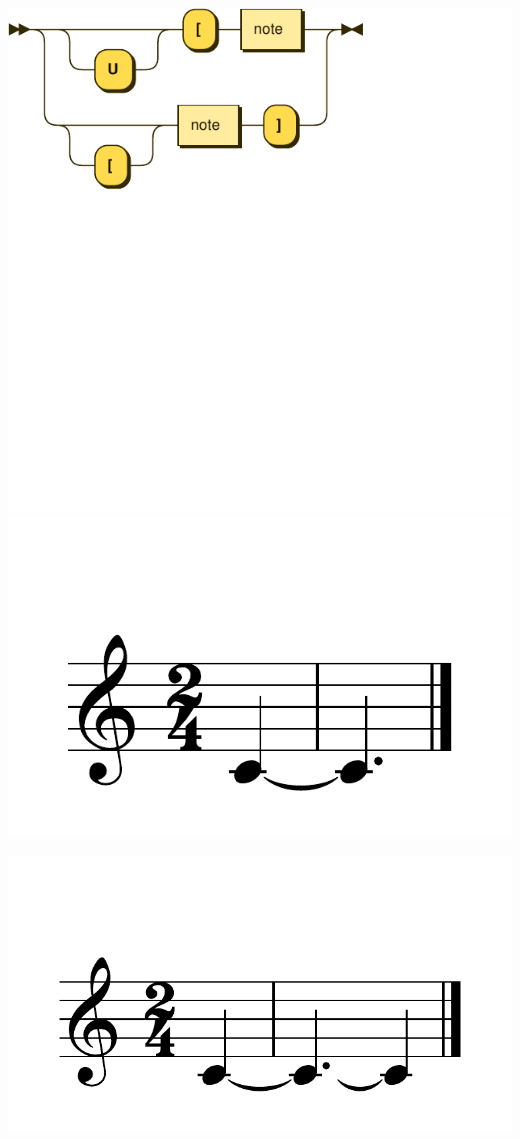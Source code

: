 \documentclass{article}
\begin{document}
\includegraphics[scale=0.5]{figures_railroad/pdf/skern/ties.pdf}
\includegraphics[scale=0.5]{figures_tests/pdf/skern/ties1.pdf}

\includegraphics[scale=0.5]{figures_tests/pdf/skern/ties2.pdf}
\end{document}

